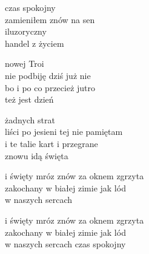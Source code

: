 \begin{text}
    czas spokojny\\
    zamieniłem znów na sen\\
    iluzoryczny\\
    handel z życiem

    nowej Troi\\
    nie podbiję dziś już nie\\
    bo i po co przecież jutro\\
    też jest dzień

    żadnych strat\\
    liści po jesieni tej nie pamiętam\\
    i te talie kart i przegrane\\
    znowu idą święta

    i święty mróz znów za oknem zgrzyta\\
    zakochany w białej zimie jak lód\\
    w naszych sercach

    i święty mróz znów za oknem zgrzyta\\
    zakochany w białej zimie jak lód\\
    w naszych sercach czas spokojny
\end{text}
\begin{chord}

\end{chord}